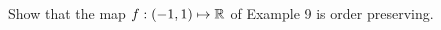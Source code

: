\documentclass[main.tex]{subfiles}
\begin{document}
\subproblem{}\label{s03p10a}

Show that the map \({f}: {({-1},{1})} \mapsto{} {\mathbb{R}}\) of Example 9 is
order preserving.

\todo{}
\end{document}
